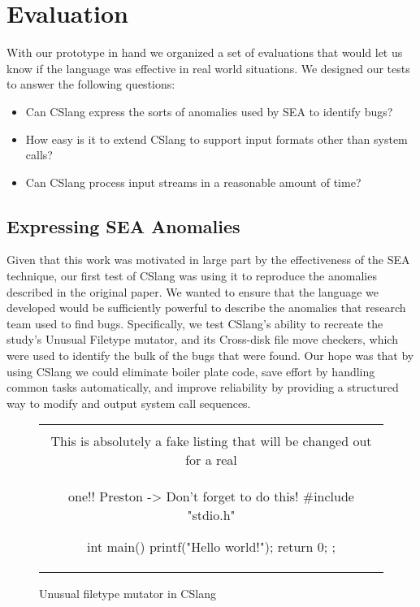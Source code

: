 \section{Evaluation}
\label{SEC:evaluation}

With our prototype in hand we organized a set of
evaluations that would let us know if the language was effective
in real world situations.
We designed our tests to answer the following questions:

\begin{itemize}

  \item{Can CSlang express the sorts of anomalies used by SEA to identify
    bugs?}

  \item{How easy is it to extend CSlang to support input formats other than
    system calls?}

  \item{Can CSlang process input streams in a reasonable amount of time?}

\end{itemize}


\subsection{Expressing SEA Anomalies}
\label{sub:SEAAnomalies}
Given that this work was motivated
in large part
by the effectiveness of the SEA technique,
our first test of CSlang was using it to reproduce the anomalies described
in the original paper.
We wanted to ensure that
the language we developed
would be sufficiently powerful
to describe the anomalies that
research team used to
find bugs.
Specifically, we test CSlang's ability to recreate
the study's Unusual Filetype mutator,
and its Cross-disk file move checkers, which were used to identify
the bulk of
the bugs that were found.
Our hope was that by using CSlang we could eliminate boiler plate code,
save effort by handling common tasks automatically, and improve reliability
by providing a structured way to modify and output system call sequences.

\begin{figure}[H]
\centering
\begin{tabular}{c}
\begin{lstlisting}
\\ This is absolutely a fake listing that will be changed out for a real
\\ one!!  Preston -> Don't forget to do this!
#include "stdio.h"

int main() {
    printf("Hello world!\n");
    return 0;
};
\end{lstlisting}
\end{tabular}
\caption{Unusual filetype mutator in CSlang}
\label{lst:UnusualFiletypeCSlang}
\end{figure}

